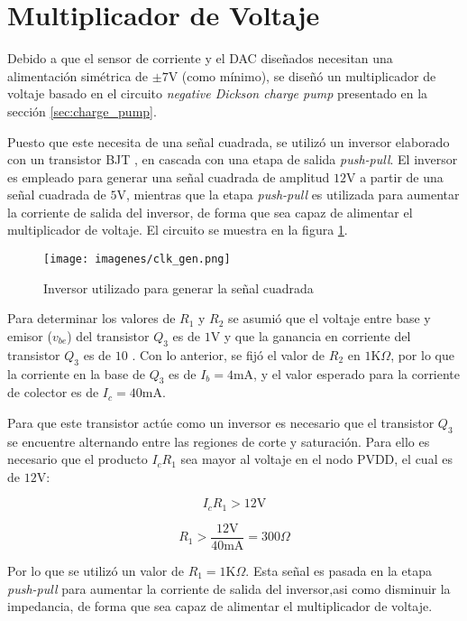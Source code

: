     \section{Multiplicador de Voltaje}

    Debido a que el sensor de corriente y el DAC diseñados necesitan una
    alimentación simétrica de $\pm 7\text{V}$ (como mínimo), se diseñó 
    un multiplicador de voltaje basado en el circuito \textit{negative 
    Dickson charge pump} presentado en la sección \ref{sec:charge_pump}.


    Puesto que este necesita de una señal cuadrada, se utilizó un inversor
    elaborado con un transistor BJT , en cascada con una etapa de salida 
    \textit{push-pull}. El inversor es empleado para generar una señal
    cuadrada de amplitud $12\text{V}$ a partir de una señal cuadrada 
    de $5\text{V}$, mientras que la etapa \textit{push-pull}
    es utilizada para aumentar la corriente de salida del inversor, de forma
    que sea capaz de alimentar el multiplicador de voltaje. El circuito
    se muestra en la figura \ref{fig:inversor}.
    
    \begin{figure}[H]
        \centering
        \texttt{[image: imagenes/clk\_gen.png]}
        \caption{Inversor utilizado para generar la señal cuadrada}
        \label{fig:inversor}
    \end{figure}

    Para determinar los valores de $R_1$ y $R_2$
    se asumió que el voltaje entre base y emisor ($v_{be}$) del transistor $Q_3$
    es de $1\text{V}$  y que la ganancia en corriente del 
    transistor $Q_3$ es de $10$ \cite{mmtb5551}. Con lo anterior, se fijó el 
    valor de $R_2$ en $1\text{K}\Omega$, por 
    lo que la corriente en la base de $Q_3$ es de $I_b = 4\text{mA}$, y el valor
     esperado para la corriente de colector es de $I_c = 40\text{mA}$.

    Para que este transistor actúe como un inversor es necesario que 
    el transistor $Q_3$ se encuentre alternando entre
    las regiones de corte y saturación. Para ello es necesario
    que el producto $I_cR_1$ sea mayor al voltaje en el nodo PVDD, el cual
    es de $12\text{V}$:
    
    $$
        I_cR_1 > 12\text{V}
    $$
    
   
    $$
        R_1 > \frac{12\text{V}}{40\text{mA}} = 300 \Omega
    $$

    
    Por lo que se utilizó un valor de $R_1 = 1\text{K}\Omega$. Esta señal es 
    pasada en la etapa \textit{push-pull} para aumentar la corriente de salida
    del inversor,asi como disminuir la impedancia, de forma que sea 
    capaz de alimentar el multiplicador de voltaje.

